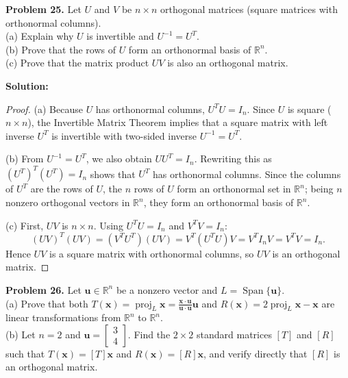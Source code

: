 \documentclass[11pt, letterpaper]{article}
\theoremstyle{definition}
\theoremstyle{remark}
\begin{document}
\textbf{Problem 25.} Let $U$ and $V$ be $n \times n$ orthogonal matrices (square matrices with orthonormal columns). \\
(a) Explain why $U$ is invertible and $U^{-1} = U^T$. \\
(b) Prove that the rows of $U$ form an orthonormal basis of $\mathbb{R}^n$. \\
(c) Prove that the matrix product $UV$ is also an orthogonal matrix.

\textbf{Solution:}
\begin{proof}
(a) Because $U$ has orthonormal columns, $U^T U = I_n$. Since $U$ is square ($n \times n$), the Invertible Matrix Theorem implies that a square matrix with left inverse $U^T$ is invertible with two-sided inverse $U^{-1} = U^T$.

(b) From $U^{-1} = U^T$, we also obtain $U U^T = I_n$. Rewriting this as $(U^T)^T (U^T) = I_n$ shows that $U^T$ has orthonormal columns. Since the columns of $U^T$ are the rows of $U$, the $n$ rows of $U$ form an orthonormal set in $\mathbb{R}^n$; being $n$ nonzero orthogonal vectors in $\mathbb{R}^n$, they form an orthonormal basis of $\mathbb{R}^n$.

(c) First, $UV$ is $n \times n$. Using $U^T U = I_n$ and $V^T V = I_n$:
\[
(UV)^T (UV) = (V^T U^T)(UV) = V^T (U^T U) V = V^T I_n V = V^T V = I_n.
\]
Hence $UV$ is a square matrix with orthonormal columns, so $UV$ is an orthogonal matrix.
\end{proof}

\textbf{Problem 26.} Let $\mathbf{u} \in \mathbb{R}^n$ be a nonzero vector and $L = \operatorname{Span}\{\mathbf{u}\}$. \\
(a) Prove that both $T(\mathbf{x}) = \operatorname{proj}_L \mathbf{x} = \frac{\mathbf{x} \cdot \mathbf{u}}{\mathbf{u} \cdot \mathbf{u}}\mathbf{u}$ and $R(\mathbf{x}) = 2\operatorname{proj}_L \mathbf{x} - \mathbf{x}$ are linear transformations from $\mathbb{R}^n$ to $\mathbb{R}^n$. \\
(b) Let $n = 2$ and $\mathbf{u} = \begin{bmatrix} 3 \\ 4 \end{bmatrix}$. Find the $2 \times 2$ standard matrices $[T]$ and $[R]$ such that $T(\mathbf{x}) = [T]\mathbf{x}$ and $R(\mathbf{x}) = [R]\mathbf{x}$, and verify directly that $[R]$ is an orthogonal matrix.
\end{document}

